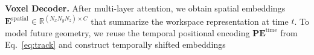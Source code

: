 \smallskip
\noindent \textbf{Voxel Decoder.}
%
%
After multi-layer attention, we obtain spatial embeddings $\mathbf{E}^{\text{spatial}} \in \mathbb{R}^{(N_x N_y N_z) \times C}$ that summarize the workspace representation at time $t$. To model future geometry, we reuse the temporal positional encoding $\mathbf{PE}^{\text{time}}$ from Eq.~\eqref{eq:track} and construct temporally shifted embeddings
